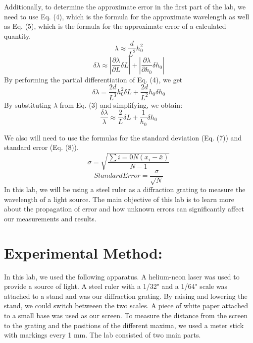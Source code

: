 \documentclass[leqno]{article}
\begin{document}
\noindent Additionally, to determine the approximate error in the first part of the lab, we need to use Eq. (4), which is the formula for the approximate wavelength as well as Eq. (5), which is the formula for the approximate error of a calculated quantity.
\begin{equation}
	\lambda \approx \frac{d}{L^2} h_0^2
\end{equation}
\begin{equation}
	\delta \lambda \approx |\frac{\partial \lambda}{\partial L}\delta L|+ |\frac{\partial\lambda}{\partial h_0}\delta h_0|
\end{equation}
By performing the partial differentiation of Eq. (4), we get
\begin{equation}
	\delta\lambda=\frac{2d}{L^3}h_0^2  \delta L+\frac{2d}{L^2}h_0  \delta h_0
\end{equation}
By substituting $\lambda$ from Eq. (3) and simplifying, we obtain:
\begin{equation}
  \frac{\delta \lambda}{\lambda} \approx \frac{2}{L} \delta L + \frac{1}{h_0} \delta h_0
  \end{equation}
  
We also will need to use the formulas for the standard deviation (Eq. (7)) and standard error (Eq. (8)).
\begin{equation}
	\sigma=\sqrt{\frac{\sum{i=0}{N}{(x_i-\bar{x})}}{N-1}}
\end{equation}
\begin{equation}
	Standard Error=\frac{\sigma}{\sqrt{N}}
\end{equation}
In this lab, we will be using a steel ruler as a diffraction grating to measure the wavelength of a light source.  The main objective of this lab is to learn more about the propagation of error and how unknown errors can significantly affect our measurements and results.
\section*{Experimental Method:}
In this lab, we used the following apparatus.  A helium-neon laser was used to provide a source of light.  A steel ruler with a 1/32" and a 1/64" scale was attached to a stand and was our diffraction grating.  By raising and lowering the stand, we could switch betweeen the two scales.  A piece of white paper attached to a small base was used as our screen.  To measure the distance from the screen to the grating and the positions of the different maxima, we used a meter stick with markings every 1 mm.
The lab consisted of two main parts.  
\end{document}
